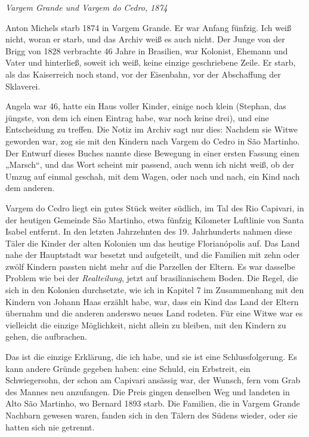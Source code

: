\documentclass[
  ngerman,
  11pt,
  openany]{book}
\begin{document}
\emph{Vargem Grande und Vargem do Cedro, 1874}

Anton Michels starb 1874 in Vargem Grande. Er war Anfang fünfzig. Ich
weiß nicht, woran er starb, und das Archiv weiß es auch nicht. Der Junge
von der Brigg von 1828 verbrachte 46 Jahre in Brasilien, war Kolonist,
Ehemann und Vater und hinterließ, soweit ich weiß, keine einzige
geschriebene Zeile. Er starb, als das Kaiserreich noch stand, vor der
Eisenbahn, vor der Abschaffung der Sklaverei.

Angela war 46, hatte ein Haus voller Kinder, einige noch klein (Stephan,
das jüngste, von dem ich einen Eintrag habe, war noch keine drei), und
eine Entscheidung zu treffen. Die Notiz im Archiv sagt nur dies: Nachdem
sie Witwe geworden war, zog sie mit den Kindern nach Vargem do Cedro in
São Martinho. Der Entwurf dieses Buches nannte diese Bewegung in einer
ersten Fassung einen „Marsch``, und das Wort scheint mir passend, auch
wenn ich nicht weiß, ob der Umzug auf einmal geschah, mit dem Wagen,
oder nach und nach, ein Kind nach dem anderen.

Vargem do Cedro liegt ein gutes Stück weiter südlich, im Tal des Rio
Capivari, in der heutigen Gemeinde São Martinho, etwa fünfzig Kilometer
Luftlinie von Santa Isabel entfernt. In den letzten Jahrzehnten des 19.
Jahrhunderts nahmen diese Täler die Kinder der alten Kolonien um das
heutige Florianópolis auf. Das Land nahe der Hauptstadt war besetzt und
aufgeteilt, und die Familien mit zehn oder zwölf Kindern passten nicht
mehr auf die Parzellen der Eltern. Es war dasselbe Problem wie bei der
\emph{Realteilung}, jetzt auf brasilianischem Boden. Die Regel, die sich
in den Kolonien durchsetzte, wie ich in Kapitel 7 im Zusammenhang mit
den Kindern von Johann Haas erzählt habe, war, dass ein Kind das Land
der Eltern übernahm und die anderen anderswo neues Land rodeten. Für
eine Witwe war es vielleicht die einzige Möglichkeit, nicht allein zu
bleiben, mit den Kindern zu gehen, die aufbrachen.

Das ist die einzige Erklärung, die ich habe, und sie ist eine
Schlussfolgerung. Es kann andere Gründe gegeben haben: eine Schuld, ein
Erbstreit, ein Schwiegersohn, der schon am Capivari ansässig war, der
Wunsch, fern vom Grab des Mannes neu anzufangen. Die Preis gingen
denselben Weg und landeten in Alto São Martinho, wo Bernard 1893 starb.
Die Familien, die in Vargem Grande Nachbarn gewesen waren, fanden sich
in den Tälern des Südens wieder, oder sie hatten sich nie getrennt.
\end{document}
